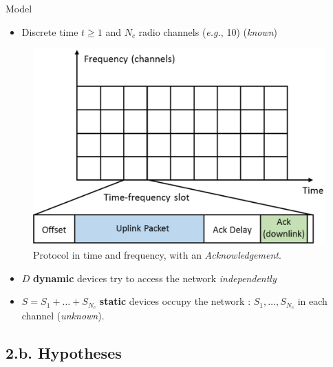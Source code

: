 \documentclass[12pt,english,ignorenonframetext,aspectratio=169,]{beamer}
\providecommand{\tightlist}{%
  \setlength{\itemsep}{0pt}\setlength{\parskip}{0pt}}
\begin{document}
\begin{frame}{Model}

\begin{itemize}
\tightlist
\item
  Discrete time \(t\geq1\) and \(N_c\) radio channels (\emph{e.g.}, 10)
  \hfill{} (\emph{known})
\end{itemize}

\begin{figure}[h!]
\centering
\includegraphics[height=0.35\textheight]{protocol.eps}
\caption{\small{Protocol in time and frequency, with an \emph{Acknowledgement}.}}
\end{figure}

\begin{itemize}
\tightlist
\item
  \(D\) \textbf{dynamic} devices try to access the network
  \emph{independently}
\item
  \(S=S_1+\dots+S_{N_c}\) \textbf{static} devices occupy the network :
  \newline
   \(S_1,\dots,S_{N_c}\) in each channel \hfill{} (\emph{unknown}).
\end{itemize}

\end{frame}



\subsection{\hfill{}2.b. Hypotheses\hfill{}}
\end{document}
